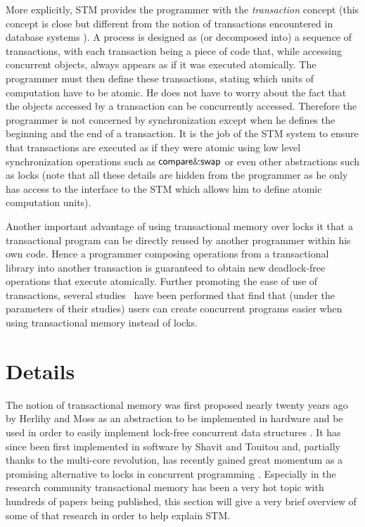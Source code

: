 More explicitly,  STM  
 provides the 
programmer  with the {\it transaction} concept (this concept 
is close but different from the notion of transactions encountered in 
database systems \cite{FFGH08,HCUAGSV07,HL08}).
 A process is designed as 
(or decomposed into)  a sequence of transactions, with each transaction 
being a piece  of code that, while  accessing  concurrent  objects, 
always  appears as if it was  executed atomically.
The programmer must then define these transactions, stating which  units of computation
have  to be atomic.  He does not have to worry about the fact that the 
objects accessed by  a transaction can be concurrently accessed. 
Therefore the programmer is not concerned by synchronization
except when he defines the beginning and the end of a  transaction.
It  is the job of the 
STM system to ensure that transactions are executed as if they were atomic using low level synchronization
operations such as $\lit{compare\&swap}$ or even other abstractions such as locks
(note that all these details are hidden from the programmer as he only has access to the interface
to the STM which allows him to define atomic computation units).

Another important advantage of using transactional memory over locks it that a transactional program
can be directly reused by another programmer within his own code.
Hence a programmer composing operations from a transactional library into another 
transaction is guaranteed to obtain new deadlock-free operations that execute atomically.
Further promoting the ease of use of transactions, several studies~\cite{PA11,RHW10}
have been performed that find that (under the parameters of their studies) users can create concurrent programs
easier when using transactional memory instead of locks.




\section{Details}
\label{sec:details}
The notion  of   transactional  memory  was
first   proposed  nearly twenty years ago by Herlihy  and Moss 
as an abstraction to be implemented in hardware and be used in order to easily 
implement lock-free concurrent  data structures  \cite{HM93}.  It  has  since  been 
first implemented in software  by Shavit  and  Touitou   \cite{ST97} and, partially thanks
to the multi-core revolution,  has
recently gained great  momentum as  a promising alternative  to locks in
concurrent programming  \cite{FFGH08,HCUAGSV07,LK08,R08}.
Especially in the research community transactional memory has been a very hot topic with hundreds
of papers being published, this section will give a very brief overview of some of that research
in order to help explain STM.


